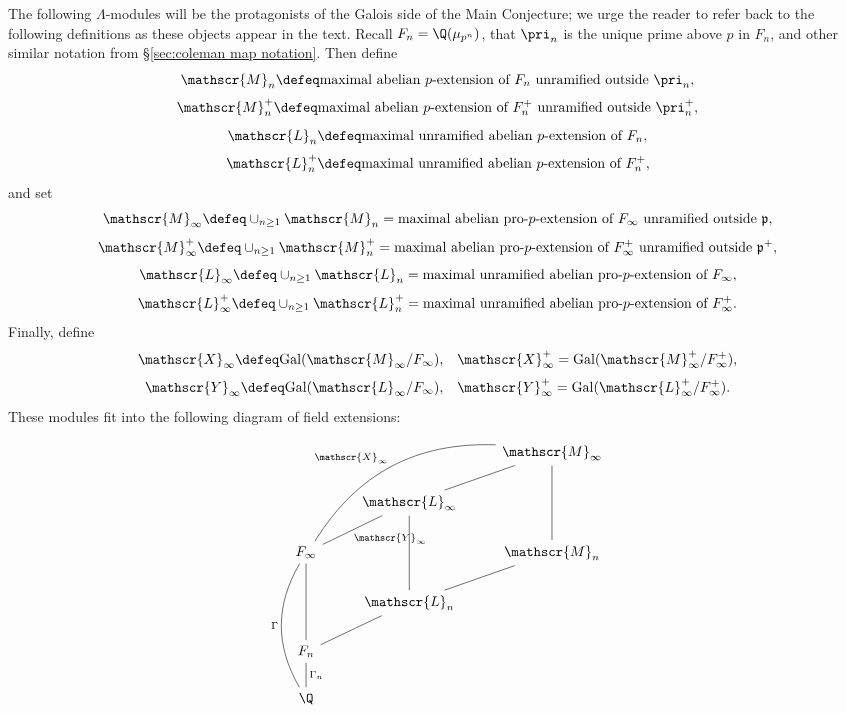 \documentclass[a4paper,10pt, english, reqno]{smfart}
\newcommand{\GG}{\Gamma}
\numberwithin{equation}{section}
\begin{document}
The following $\Lambda$-modules will be the protagonists of the Galois side of the Main Conjecture; we urge the reader to refer back to the following definitions as these objects appear in the text. Recall $F_n = \Q(\mu_{p^n})$, that $\pri_n$ is the unique prime above $p$ in $F_n$, and other similar notation from \S\ref{sec:coleman map notation}. Then define
\[ 
\mathscr{M}_n \defeq \text{maximal abelian $p$-extension of $F_n$ unramified outside $\pri_n$}, \]
\[ \mathscr{M}^+_n \defeq \text{maximal abelian $p$-extension of $F^+_n$ unramified outside $\pri_n^+$}, \]
\[ \mathscr{L}_n \defeq \text{maximal unramified abelian $p$-extension of $F_n$}, \]
\[ \mathscr{L}^+_n \defeq \text{maximal unramified abelian $p$-extension of $F^+_n$},
\]
and set
\[ 
\mathscr{M}_\infty \defeq \cup_{n \geq 1} \mathscr{M}_n = \text{maximal abelian pro-$p$-extension of $F_\infty$ unramified outside $\mathfrak{p}$}, \]
\[ \mathscr{M}^+_\infty \defeq \cup_{n \geq 1} \mathscr{M}^+_n = \text{maximal abelian pro-$p$-extension of $F^+_\infty$ unramified outside $\mathfrak{p}^+$}, \]
\[ \mathscr{L}_\infty \defeq \cup_{n \geq 1} \mathscr{L}_n = \text{maximal unramified abelian  pro-$p$-extension of $F_\infty$}, \]
\[ \mathscr{L}^+_\infty \defeq \cup_{n \geq 1} \mathscr{L}^{+}_n = \text{maximal unramified abelian pro-$p$-extension of $F^+_\infty$}.
 \]
Finally, define
\[
 \mathscr{X}_\infty \defeq \mathrm{Gal}(\mathscr{M}_\infty / F_\infty), \;\;\; \mathscr{X}^+_\infty = \mathrm{Gal}(\mathscr{M}^+_\infty / F^+_\infty), \]
\[ \mathscr{Y}_\infty \defeq \mathrm{Gal}(\mathscr{L}_\infty / F_\infty), \;\;\; \mathscr{Y}^+_\infty = \mathrm{Gal}(\mathscr{L}^+_\infty / F^+_\infty). 
\]
These modules fit into the following diagram of field extensions:

\[
\begin{tikzcd}[every arrow/.append style={dash}]
&                                & \mathscr{M}_\infty \\
& \mathscr{L}_\infty\arrow[ur]   & \\
F_\infty \arrow[ur,"\! \mathscr{Y}_\infty"'] \arrow[uurr, bend left, "\mathscr{X}_\infty"] & & \mathscr{M}_n\arrow[uu]\\
&\mathscr{L}_n \arrow[uu]\arrow[ur]                  &\\
F_n \arrow[uu]\arrow[ur]       &                                 & \\
\Q \arrow[u, "\GG_n"']\arrow[uuu, bend left, "\GG"]       &                          &
\end{tikzcd}
\]
\end{document}
